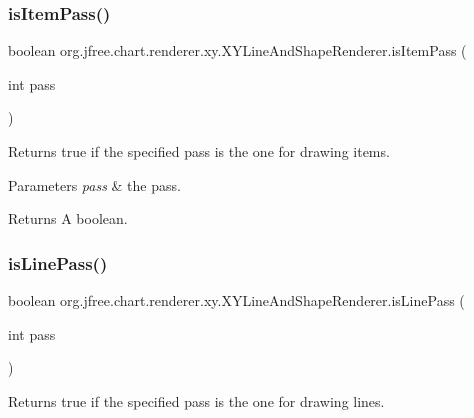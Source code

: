 \subsubsection{\texorpdfstring{is\+Item\+Pass()}{isItemPass()}}
{\footnotesize\ttfamily boolean org.\+jfree.\+chart.\+renderer.\+xy.\+X\+Y\+Line\+And\+Shape\+Renderer.\+is\+Item\+Pass (\begin{DoxyParamCaption}\item[{int}]{pass }\end{DoxyParamCaption})\hspace{0.3cm}{\ttfamily [protected]}}

Returns {\ttfamily true} if the specified pass is the one for drawing items.


\begin{DoxyParams}{Parameters}
{\em pass} & the pass.\\
\hline
\end{DoxyParams}
\begin{DoxyReturn}{Returns}
A boolean. 
\end{DoxyReturn}
\mbox{\label{classorg_1_1jfree_1_1chart_1_1renderer_1_1xy_1_1_x_y_line_and_shape_renderer_a4d8409c509d8ac71ad3808fb0f73b0b0}} 
\subsubsection{\texorpdfstring{is\+Line\+Pass()}{isLinePass()}}
{\footnotesize\ttfamily boolean org.\+jfree.\+chart.\+renderer.\+xy.\+X\+Y\+Line\+And\+Shape\+Renderer.\+is\+Line\+Pass (\begin{DoxyParamCaption}\item[{int}]{pass }\end{DoxyParamCaption})\hspace{0.3cm}{\ttfamily [protected]}}

Returns {\ttfamily true} if the specified pass is the one for drawing lines.


